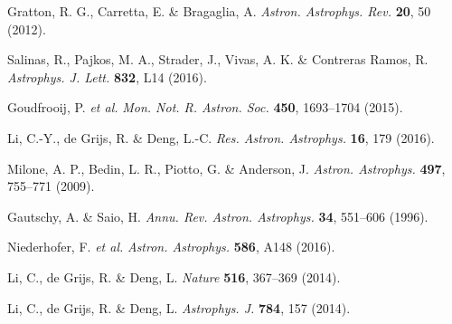 \documentclass{natureprintstyle2}
\begin{document}
\begin{thebibliography}{61}

 Gratton, R. G., Carretta, E. \& Bragaglia, A. {\it
  Astron. Astrophys. Rev.} {\bf 20}, 50 (2012).

 Salinas, R., Pajkos, M. A., Strader, J., Vivas,
  A. K. \& Contreras Ramos, R. {\it Astrophys. J. Lett.} {\bf 832},
  L14 (2016).

 Goudfrooij, P. {\it et al.} {\it
  Mon. Not. R. Astron. Soc.} {\bf 450}, 1693--1704 (2015).

 Li, C.-Y., de Grijs, R. \& Deng, L.-C. {\it
  Res. Astron. Astrophys.} {\bf 16}, 179 (2016).

 Milone, A. P., Bedin, L. R., Piotto, G. \& Anderson,
  J. {\it Astron. Astrophys.} {\bf 497}, 755--771 (2009).

 Gautschy, A. \& Saio, H. {\it
  Annu. Rev. Astron. Astrophys.} {\bf 34}, 551--606 (1996).

 Niederhofer, F. {\it et al.} {\it Astron. Astrophys.}
  {\bf 586}, A148 (2016).

 Li, C., de Grijs, R. \& Deng, L. {\it Nature} {\bf
  516}, 367--369 (2014).

 Li, C., de Grijs, R. \& Deng, L. {\it Astrophys. J.}
  {\bf 784}, 157 (2014).

\end{thebibliography}
\end{document}
